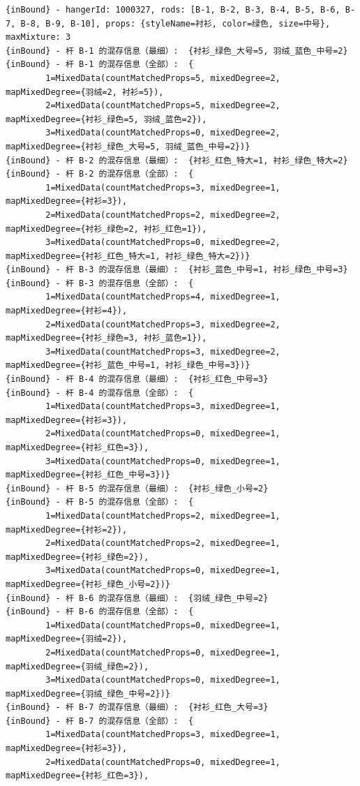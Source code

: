 {\begin{verbatim}
{inBound} - hangerId: 1000327, rods: [B-1, B-2, B-3, B-4, B-5, B-6, B-7, B-8, B-9, B-10], props: {styleName=衬衫, color=绿色, size=中号}, maxMixture: 3
{inBound} - 杆 B-1 的混存信息（最细）:  {衬衫_绿色_大号=5, 羽绒_蓝色_中号=2}
{inBound} - 杆 B-1 的混存信息（全部）:  {
		1=MixedData(countMatchedProps=5, mixedDegree=2, mapMixedDegree={羽绒=2, 衬衫=5}), 
		2=MixedData(countMatchedProps=5, mixedDegree=2, mapMixedDegree={衬衫_绿色=5, 羽绒_蓝色=2}), 
		3=MixedData(countMatchedProps=0, mixedDegree=2, mapMixedDegree={衬衫_绿色_大号=5, 羽绒_蓝色_中号=2})}
{inBound} - 杆 B-2 的混存信息（最细）:  {衬衫_红色_特大=1, 衬衫_绿色_特大=2}
{inBound} - 杆 B-2 的混存信息（全部）:  {
		1=MixedData(countMatchedProps=3, mixedDegree=1, mapMixedDegree={衬衫=3}), 
		2=MixedData(countMatchedProps=2, mixedDegree=2, mapMixedDegree={衬衫_绿色=2, 衬衫_红色=1}), 
		3=MixedData(countMatchedProps=0, mixedDegree=2, mapMixedDegree={衬衫_红色_特大=1, 衬衫_绿色_特大=2})}
{inBound} - 杆 B-3 的混存信息（最细）:  {衬衫_蓝色_中号=1, 衬衫_绿色_中号=3}
{inBound} - 杆 B-3 的混存信息（全部）:  {
		1=MixedData(countMatchedProps=4, mixedDegree=1, mapMixedDegree={衬衫=4}), 
		2=MixedData(countMatchedProps=3, mixedDegree=2, mapMixedDegree={衬衫_绿色=3, 衬衫_蓝色=1}), 
		3=MixedData(countMatchedProps=3, mixedDegree=2, mapMixedDegree={衬衫_蓝色_中号=1, 衬衫_绿色_中号=3})}
{inBound} - 杆 B-4 的混存信息（最细）:  {衬衫_红色_中号=3}
{inBound} - 杆 B-4 的混存信息（全部）:  {
		1=MixedData(countMatchedProps=3, mixedDegree=1, mapMixedDegree={衬衫=3}), 
		2=MixedData(countMatchedProps=0, mixedDegree=1, mapMixedDegree={衬衫_红色=3}), 
		3=MixedData(countMatchedProps=0, mixedDegree=1, mapMixedDegree={衬衫_红色_中号=3})}
{inBound} - 杆 B-5 的混存信息（最细）:  {衬衫_绿色_小号=2}
{inBound} - 杆 B-5 的混存信息（全部）:  {
		1=MixedData(countMatchedProps=2, mixedDegree=1, mapMixedDegree={衬衫=2}), 
		2=MixedData(countMatchedProps=2, mixedDegree=1, mapMixedDegree={衬衫_绿色=2}), 
		3=MixedData(countMatchedProps=0, mixedDegree=1, mapMixedDegree={衬衫_绿色_小号=2})}
{inBound} - 杆 B-6 的混存信息（最细）:  {羽绒_绿色_中号=2}
{inBound} - 杆 B-6 的混存信息（全部）:  {
		1=MixedData(countMatchedProps=0, mixedDegree=1, mapMixedDegree={羽绒=2}), 
		2=MixedData(countMatchedProps=0, mixedDegree=1, mapMixedDegree={羽绒_绿色=2}), 
		3=MixedData(countMatchedProps=0, mixedDegree=1, mapMixedDegree={羽绒_绿色_中号=2})}
{inBound} - 杆 B-7 的混存信息（最细）:  {衬衫_红色_大号=3}
{inBound} - 杆 B-7 的混存信息（全部）:  {
		1=MixedData(countMatchedProps=3, mixedDegree=1, mapMixedDegree={衬衫=3}), 
		2=MixedData(countMatchedProps=0, mixedDegree=1, mapMixedDegree={衬衫_红色=3}), 

\end{verbatim}}
